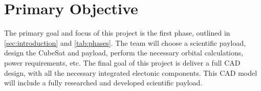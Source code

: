 \documentclass[conference]{IEEEtran} %
\begin{document}
\section{Primary Objective}
\label{sec:primary-obj}
The primary goal and focus of this project is the first phase, outlined in \autoref{sec:introduction} and \autoref{tab:phases}. The team will
choose a scientific payload, design the CubeSat and payload, perform the necessary orbital calculations, power requirements, etc. The final goal of
this project is deliver a full CAD design, with all the necessary integrated electonic components. This CAD model will include a fully researched and
developed scientific payload.



\end{document}
